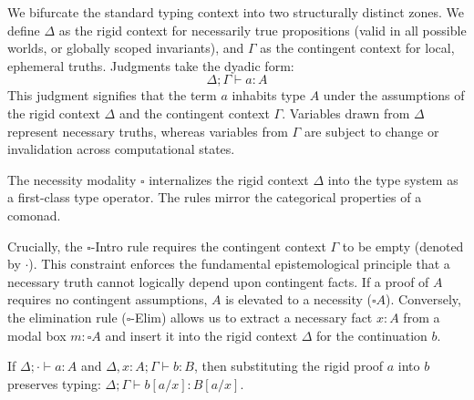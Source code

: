 \begin{definition}
We bifurcate the standard typing context into two structurally distinct zones. We define $\Delta$ as the rigid context for necessarily true propositions (valid in all possible worlds, or globally scoped invariants), and $\Gamma$ as the contingent context for local, ephemeral truths. Judgments take the dyadic form:
\[
\Delta; \Gamma \vdash a : A
\]
This judgment signifies that the term $a$ inhabits type $A$ under the assumptions of the rigid context $\Delta$ and the contingent context $\Gamma$. Variables drawn from $\Delta$ represent necessary truths, whereas variables from $\Gamma$ are subject to change or invalidation across computational states.
\end{definition}

The necessity modality $\square$ internalizes the rigid context $\Delta$ into the type system as a first-class type operator. The rules mirror the categorical properties of a comonad.
\begin{mathpar}


\end{mathpar}

Crucially, the $\square$-Intro rule requires the contingent context $\Gamma$ to be empty (denoted by $\cdot$). This constraint enforces the fundamental epistemological principle that a necessary truth cannot logically depend upon contingent facts. If a proof of $A$ requires no contingent assumptions, $A$ is elevated to a necessity ($\square A$). Conversely, the elimination rule ($\square$-Elim) allows us to extract a necessary fact $x : A$ from a modal box $m : \square A$ and insert it into the rigid context $\Delta$ for the continuation $b$.

\begin{lemma}
If $\Delta; \cdot \vdash a : A$ and $\Delta, x:A; \Gamma \vdash b : B$, then substituting the rigid proof $a$ into $b$ preserves typing: $\Delta; \Gamma \vdash b[a/x] : B[a/x]$.
\end{lemma}

